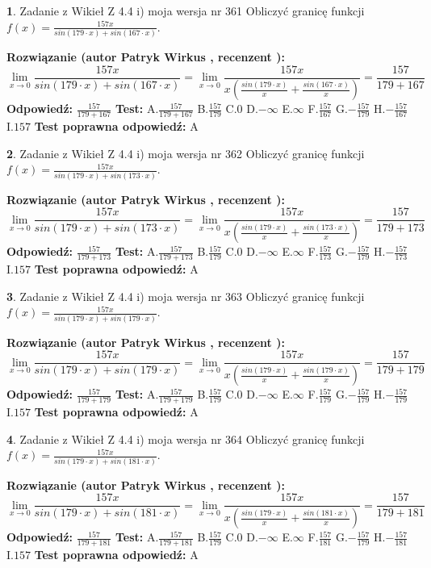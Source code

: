 \documentclass[12pt, a4paper]{article}
\theoremstyle{definition} %
\newtheorem{zad}{}
\newcommand{\zadStart}[1]{\begin{zad}#1\newline}
\newcommand{\zadStop}{\end{zad}}
\newcommand{\rozwStart}[2]{\noindent \textbf{Rozwiązanie (autor #1 , recenzent #2): }\newline}
\newcommand{\rozwStop}{\newline}
\newcommand{\odpStart}{\noindent \textbf{Odpowiedź:}\newline}
\newcommand{\odpStop}{\newline}
\newcommand{\testStart}{\noindent \textbf{Test:}\newline}
\newcommand{\testStop}{\newline}
\newcommand{\kluczStart}{\noindent \textbf{Test poprawna odpowiedź:}\newline}
\newcommand{\kluczStop}{\newline}
\begin{document}
\zadStart{Zadanie z Wikieł Z 4.4 i) moja wersja nr 361}
Obliczyć granicę funkcji $f(x)=\frac{157x}{sin(179\cdot x) +sin(167\cdot x)}$.
\zadStop
\rozwStart{Patryk Wirkus}{}
$$\lim\limits_{x\to 0}\frac{157x}{sin(179\cdot x) +sin(167\cdot x)}=\lim\limits_{x\to 0}\frac{157x}{x(\frac{sin(179\cdot x)}{x}+\frac{sin(167\cdot x)}{x})}=\frac{157}{179+167}$$
\rozwStop
\odpStart
$\frac{157}{179+167}$
\odpStop
\testStart
A.$\frac{157}{179+167}$
B.$\frac{157}{179}$
C.$0$
D.$-\infty$
E.$\infty$
F.$\frac{157}{167}$
G.$-\frac{157}{179}$
H.$-\frac{157}{167}$
I.$157$
\testStop
\kluczStart
A
\kluczStop



\zadStart{Zadanie z Wikieł Z 4.4 i) moja wersja nr 362}
Obliczyć granicę funkcji $f(x)=\frac{157x}{sin(179\cdot x) +sin(173\cdot x)}$.
\zadStop
\rozwStart{Patryk Wirkus}{}
$$\lim\limits_{x\to 0}\frac{157x}{sin(179\cdot x) +sin(173\cdot x)}=\lim\limits_{x\to 0}\frac{157x}{x(\frac{sin(179\cdot x)}{x}+\frac{sin(173\cdot x)}{x})}=\frac{157}{179+173}$$
\rozwStop
\odpStart
$\frac{157}{179+173}$
\odpStop
\testStart
A.$\frac{157}{179+173}$
B.$\frac{157}{179}$
C.$0$
D.$-\infty$
E.$\infty$
F.$\frac{157}{173}$
G.$-\frac{157}{179}$
H.$-\frac{157}{173}$
I.$157$
\testStop
\kluczStart
A
\kluczStop



\zadStart{Zadanie z Wikieł Z 4.4 i) moja wersja nr 363}
Obliczyć granicę funkcji $f(x)=\frac{157x}{sin(179\cdot x) +sin(179\cdot x)}$.
\zadStop
\rozwStart{Patryk Wirkus}{}
$$\lim\limits_{x\to 0}\frac{157x}{sin(179\cdot x) +sin(179\cdot x)}=\lim\limits_{x\to 0}\frac{157x}{x(\frac{sin(179\cdot x)}{x}+\frac{sin(179\cdot x)}{x})}=\frac{157}{179+179}$$
\rozwStop
\odpStart
$\frac{157}{179+179}$
\odpStop
\testStart
A.$\frac{157}{179+179}$
B.$\frac{157}{179}$
C.$0$
D.$-\infty$
E.$\infty$
F.$\frac{157}{179}$
G.$-\frac{157}{179}$
H.$-\frac{157}{179}$
I.$157$
\testStop
\kluczStart
A
\kluczStop



\zadStart{Zadanie z Wikieł Z 4.4 i) moja wersja nr 364}
Obliczyć granicę funkcji $f(x)=\frac{157x}{sin(179\cdot x) +sin(181\cdot x)}$.
\zadStop
\rozwStart{Patryk Wirkus}{}
$$\lim\limits_{x\to 0}\frac{157x}{sin(179\cdot x) +sin(181\cdot x)}=\lim\limits_{x\to 0}\frac{157x}{x(\frac{sin(179\cdot x)}{x}+\frac{sin(181\cdot x)}{x})}=\frac{157}{179+181}$$
\rozwStop
\odpStart
$\frac{157}{179+181}$
\odpStop
\testStart
A.$\frac{157}{179+181}$
B.$\frac{157}{179}$
C.$0$
D.$-\infty$
E.$\infty$
F.$\frac{157}{181}$
G.$-\frac{157}{179}$
H.$-\frac{157}{181}$
I.$157$
\testStop
\kluczStart
A
\kluczStop
\end{document}
